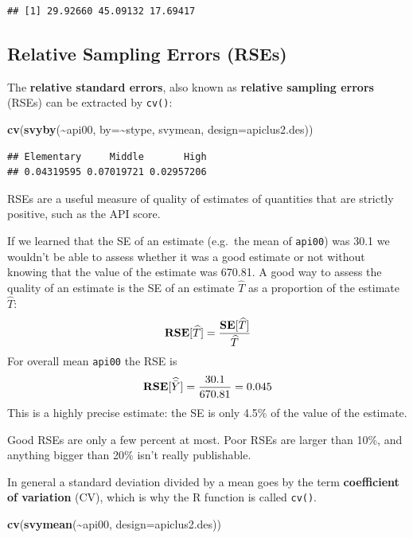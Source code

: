 \documentclass[
]{book}
\newenvironment{Shaded}{\begin{snugshade}}{\end{snugshade}}
\newcommand{\AttributeTok}[1]{\textcolor[rgb]{0.13,0.29,0.53}{#1}}
\newcommand{\FunctionTok}[1]{\textcolor[rgb]{0.13,0.29,0.53}{\textbf{#1}}}
\newcommand{\NormalTok}[1]{#1}
\newcommand{\SpecialCharTok}[1]{\textcolor[rgb]{0.81,0.36,0.00}{\textbf{#1}}}
\newcommand{\bfa}[2]{{\rm\bf #1}[#2]}
\begin{document}
\begin{verbatim}
## [1] 29.92660 45.09132 17.69417
\end{verbatim}

\subsection{Relative Sampling Errors (RSEs)}\label{relative-sampling-errors-rses}

The \textbf{relative standard errors}, also known as \textbf{relative sampling errors}
(RSEs) can be extracted by \texttt{cv()}:

\begin{Shaded}
\begin{Highlighting}[]
\FunctionTok{cv}\NormalTok{(}\FunctionTok{svyby}\NormalTok{(}\SpecialCharTok{\textasciitilde{}}\NormalTok{api00, }\AttributeTok{by=}\SpecialCharTok{\textasciitilde{}}\NormalTok{stype, svymean, }\AttributeTok{design=}\NormalTok{apiclus2.des))}
\end{Highlighting}
\end{Shaded}

\begin{verbatim}
## Elementary     Middle       High 
## 0.04319595 0.07019721 0.02957206
\end{verbatim}

RSEs are a useful measure of quality of estimates of quantities that are
strictly positive, such as the API score.

If we learned that the SE of an estimate (e.g.~the mean of \texttt{api00}) was
30.1 we wouldn't be able to assess whether it
was a good estimate or not without knowing that the value of the estimate
was 670.81. A good way to assess the quality of
an estimate is the SE of an estimate \(\widehat{T}\) as a proportion of
the estimate \(\widehat{T}\):
\[
   \bfa{RSE}{\widehat{T}} = \frac{\bfa{SE}{\widehat{T}}}{\widehat{T}}
\]
For overall mean \texttt{api00} the RSE is
\[
   \bfa{RSE}{\widehat{\bar{Y}}} 
   = \frac{30.1}{670.81} 
   = 0.045
\]
This is a highly precise estimate: the SE is only 4.5\%
of the value of the estimate.

Good RSEs are only a few percent at most. Poor RSEs are larger than 10\%, and anything bigger
than 20\% isn't really publishable.

In general a standard deviation divided by a mean goes by the term
\textbf{coefficient of variation} (CV), which is why the R function is
called \texttt{cv()}.

\begin{Shaded}
\begin{Highlighting}[]
\FunctionTok{cv}\NormalTok{(}\FunctionTok{svymean}\NormalTok{(}\SpecialCharTok{\textasciitilde{}}\NormalTok{api00, }\AttributeTok{design=}\NormalTok{apiclus2.des))}
\end{Highlighting}
\end{Shaded}
\end{document}
